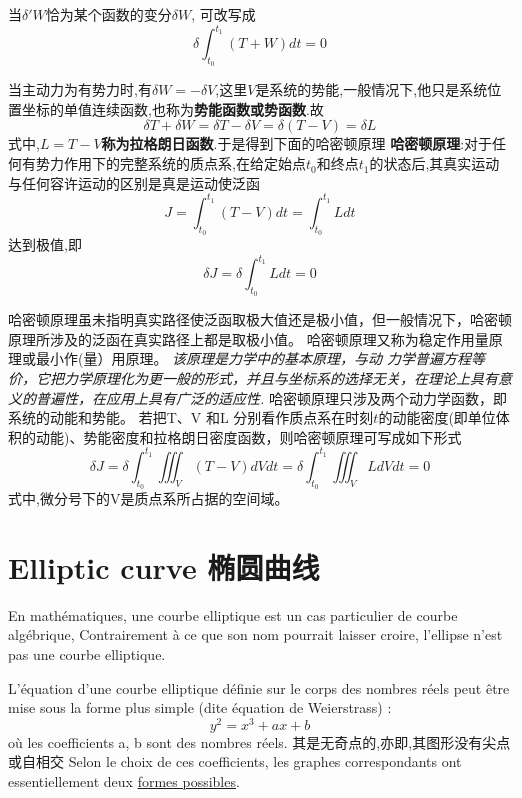 \documentclass{book}
\begin{document}
当$\delta 'W$恰为某个函数的变分$\delta W$, \lasteq 可改写成
\begin{equation}
 \delta \int_{t_0}^{t_1}(T+W)dt=0
\end{equation}

当主动力为有势力时,有$\delta W=-\delta V$,这里$V$是系统的势能,一般情况下,他只是系统位置坐标的单值连续函数,也称为\textbf{势能函数或势函数}.故
\begin{equation}
 \delta T + \delta W =\delta T -\delta V =\delta (T-V)=\delta L
\end{equation}
式中,\textbf{$L=T-V$称为拉格朗日函数}.于是得到下面的哈密顿原理
\textbf{哈密顿原理}:对于任何有势力作用下的完整系统的质点系,在给定始点$t_0$和终点$t_1$的状态后,其真实运动与任何容许运动的区别是真是运动使泛函
\begin{equation}
 J=\int_{t_0}^{t_1}(T-V)dt=\int_{t_0}^{t_1}Ldt
\end{equation}
达到极值,即
\begin{equation}
 \delta J=\delta \int_{t_0}^{t_1}Ldt=0
\end{equation}

哈密顿原理虽未指明真实路径使泛函取极大值还是极小值，但一般情况下，哈密顿原理所涉及的泛函在真实路径上都是取极小值。
哈密顿原理又称为稳定作用量原理或最小作(量）用原理。
\emph{该原理是力学中的基本原理，与动 力学普遍方程等价，它把力学原理化为更一般的形式，并且与坐标系的选择无关，在理论上具有意 义的普遍性，在应用上具有广泛的适应性.}
哈密顿原理只涉及两个动力学函数，即系统的动能和势能。 
若把T、V 和L 分别看作质点系在时刻$t$的动能密度(即单位体积的动能)、势能密度和拉格朗日密度函数，则哈密顿原理可写成如下形式
\begin{equation}
 \delta J=\delta \int_{t_0}^{t_1} \iiint_V (T-V)dVdt=\delta \int_{t_0}^{t_1} \iiint_V LdVdt =0
\end{equation}
式中,微分号下的V是质点系所占据的空间域。

\chapter{Elliptic curve 椭圆曲线}
En mathématiques, une courbe elliptique est un cas particulier de courbe algébrique,
Contrairement à ce que son nom pourrait laisser croire, l'ellipse n'est pas une courbe elliptique.

L'équation d'une courbe elliptique définie sur le corps des nombres réels peut être mise sous la forme plus simple (dite équation de Weierstrass) :
$$ y^2 = x^3 + ax + b $$
où les coefficients a, b sont des nombres réels.
其是无奇点的,亦即,其图形没有尖点或自相交
Selon le choix de ces coefficients, les graphes correspondants ont essentiellement deux
\href{http://upload.wikimedia.org/wikipedia/commons/d/d0/ECClines-3.svg}{formes possibles}.
\end{document}
